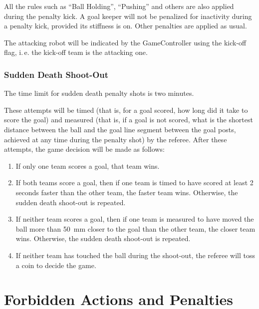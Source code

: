 \documentclass[12pt]{article}
\newcommand{\ie}{\mbox{i.\,e.}\xspace}
\begin{document}
All the rules such as ``Ball Holding'', ``Pushing'' and others are also applied during the penalty kick.  A goal keeper will not be penalized for inactivity during a penalty kick, provided its stiffness is on. Other penalties are applied as usual.

The attacking robot will be indicated by the GameController using the kick-off flag, \ie the kick-off team is the attacking one.

\subsubsection{Sudden Death Shoot-Out}

The time limit for sudden death penalty shots is two minutes.

These attempts will be timed (that is, for a goal scored, how long did it take to score the goal) and measured (that is, if a goal is not scored, what is the shortest distance between the ball and the goal line segment between the goal posts, achieved at any time during the penalty shot) by the referee. After these attempts, the game decision will be made as follows:

\begin{enumerate}

\item If only one team scores a goal, that team wins.

\item If both teams score a goal, then if one team is timed to have scored at least 2 seconds faster than the other team, the faster team wins. Otherwise, the sudden death shoot-out is repeated.

\item If neither team scores a goal, then if one team is measured to have moved the ball more than 50~mm closer to the goal than the other team, the closer team wins. Otherwise, the sudden death shoot-out is repeated.

\item If neither team has touched the ball during the shoot-out, the referee will toss a coin to decide the game.

\end{enumerate}


\newpage


\section{Forbidden Actions and Penalties}
\label{sec:forbidden_act}
\end{document}
